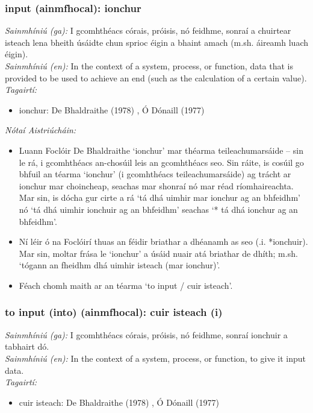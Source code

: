 \subsubsection*{input (ainmfhocal): ionchur}
 \noindent \textit{Sainmhíniú (ga):} I gcomhthéacs córais, próisis, nó feidhme, sonraí a chuirtear isteach lena bheith úsáidte chun sprioc éigin a bhaint amach (m.sh. áireamh luach éigin).
\\
 \noindent \textit{Sainmhíniú (en):} In the context of a system, process, or function, data that is provided to be used to achieve an end (such as the calculation of a certain value).
\\
 \noindent \textit{Tagairtí:}
\begin{itemize}
	\item ionchur: De Bhaldraithe (1978) \cite{de-bhaldraithe}, Ó Dónaill (1977) \cite{odonaill}
\end{itemize}

 \noindent \textit{Nótaí Aistriúcháin:}
\begin{itemize}
	\item Luann Foclóir De Bhaldraithe `ionchur' mar théarma teileachumarsáide -- sin le rá, i gcomhthéacs an-chosúil leis an gcomhthéacs seo. Sin ráite, is cosúil go bhfuil an téarma `ionchur' (i gcomhthéacs teileachumarsáide) ag trácht ar ionchur mar choincheap, seachas mar shonraí nó mar réad ríomhaireachta. Mar sin, is dócha gur cirte a rá `tá dhá uimhir mar ionchur ag an bhfeidhm' nó `tá dhá uimhir ionchuir ag an bhfeidhm' seachas `* tá dhá ionchur ag an bhfeidhm'.
	\item Ní léir ó na Foclóirí thuas an féidir briathar a dhéanamh as seo (.i. *ionchuir). Mar sin, moltar frása le `ionchur' a úsáid nuair atá briathar de dhíth; m.sh. `tógann an fheidhm dhá uimhir isteach (mar ionchur)'.
	\item Féach chomh maith ar an téarma `to input / cuir isteach'.
\end{itemize}


\subsubsection*{to input (into) (ainmfhocal): cuir isteach (i)}
 \noindent \textit{Sainmhíniú (ga):} I gcomhthéacs córais, próisis, nó feidhme, sonraí ionchuir a tabhairt dó.
\\
 \noindent \textit{Sainmhíniú (en):} In the context of a system, process, or function, to give it input data.
\\
 \noindent \textit{Tagairtí:}
\begin{itemize}
	\item cuir isteach: De Bhaldraithe (1978) \cite{de-bhaldraithe}, Ó Dónaill (1977) \cite{odonaill}
\end{itemize}

